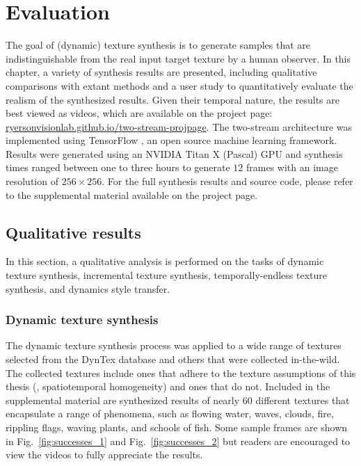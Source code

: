 \chapter{Evaluation}\label{chap:evaluation}

The goal of (dynamic) texture synthesis is to generate 
samples that are indistinguishable from the real input target
texture by a human observer.
In this chapter, a variety of synthesis results are presented,
including qualitative comparisons with extant methods and a user study to quantitatively evaluate the realism
of the synthesized results.
Given their temporal nature, the results are best viewed as 
videos, which are available on the project page: \url{ryersonvisionlab.github.io/two-stream-projpage}.
The two-stream architecture was implemented using TensorFlow
\cite{tabadi2015tensorflow}, an open source machine learning framework.
Results were generated using an NVIDIA Titan X (Pascal) GPU
and synthesis times ranged between one to three hours 
to generate $12$ frames with an image resolution of 
$256 \times 256$.
For the full synthesis results and source code, please refer to the
supplemental material available on the project page.

\section{Qualitative results}\label{sec:qualitative_results}

In this section, a qualitative analysis is performed on the tasks of dynamic texture synthesis, incremental texture synthesis,
temporally-endless texture synthesis, and dynamics style transfer.

\subsection{Dynamic texture synthesis}

The dynamic texture synthesis process was applied 
to a wide range of textures selected from the 
DynTex \cite{peteri2010} database and others that were collected in-the-wild.
The collected textures include ones that adhere to the texture assumptions of this thesis (\ie, spatiotemporal homogeneity) and ones that do not.
Included in the supplemental material are synthesized results
of nearly 60 different textures that encapsulate a range of
phenomena, such as flowing water, waves, clouds, fire, rippling
flags, waving plants, and schools of fish.
Some sample frames are shown in Fig.\ \ref{fig:successes_1} and Fig.\ \ref{fig:successes_2}
but readers are encouraged to view the videos to fully appreciate
the results.

